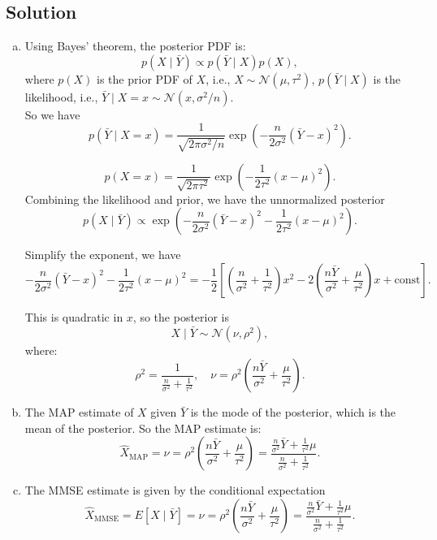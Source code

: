 \documentclass[a4paper]{article}
\begin{document}
\subsection{Solution}
\begin{enumerate}[(a)]
    \item

Using Bayes' theorem, the posterior PDF is:
\[
p(X \mid \bar{Y}) \propto p(\bar{Y} \mid X) p(X),
\]
where \( p(X) \) is the prior PDF of \( X \), i.e., \( X \sim \mathcal{N}(\mu, \tau^2) \),
\( p(\bar{Y} \mid X) \) is the likelihood, i.e., \( \bar{Y} \mid X = x \sim \mathcal{N}(x, \sigma^2 / n) \).\\
So we have
\[
p(\bar{Y} \mid X = x) = \frac{1}{\sqrt{2\pi \sigma^2 / n}} \exp\left( -\frac{n}{2\sigma^2} (\bar{Y} - x)^2 \right).
\]

\[
p(X = x) = \frac{1}{\sqrt{2\pi \tau^2}} \exp\left( -\frac{1}{2\tau^2} (x - \mu)^2 \right).
\]
Combining the likelihood and prior, we have the unnormalized posterior
\[
p(X \mid \bar{Y}) \propto \exp\left( -\frac{n}{2\sigma^2} (\bar{Y} - x)^2 - \frac{1}{2\tau^2} (x - \mu)^2 \right).
\]

Simplify the exponent, we have
\[
-\frac{n}{2\sigma^2} (\bar{Y} - x)^2 - \frac{1}{2\tau^2} (x - \mu)^2 = -\frac{1}{2} \left[ \left( \frac{n}{\sigma^2} + \frac{1}{\tau^2} \right)x^2 - 2 \left( \frac{n \bar{Y}}{\sigma^2} + \frac{\mu}{\tau^2} \right)x + \text{const} \right].
\]

This is quadratic in \( x \), so the posterior is 
\[
X \mid \bar{Y} \sim \mathcal{N}(\nu, \rho^2),
\]
where:
\[
\rho^2 = \frac{1}{\frac{n}{\sigma^2} + \frac{1}{\tau^2}}, \quad \nu = \rho^2 \left( \frac{n \bar{Y}}{\sigma^2} + \frac{\mu}{\tau^2} \right).
\]

\item The MAP estimate of \( X \) given \( \bar{Y} \) is the mode of the posterior, which is the mean of the posterior. So the MAP estimate is:
\[
\hat{X}_{\text{MAP}} = \nu = \rho^2 \left( \frac{n \bar{Y}}{\sigma^2} + \frac{\mu}{\tau^2} \right) = \frac{\frac{n}{\sigma^2} \bar{Y} + \frac{1}{\tau^2} \mu}{\frac{n}{\sigma^2} + \frac{1}{\tau^2}}.
\]

\item The MMSE estimate is given by the conditional expectation
\[
\hat{X}_{\text{MMSE}} = E[X \mid \bar{Y}] = \nu = \rho^2 \left( \frac{n \bar{Y}}{\sigma^2} + \frac{\mu}{\tau^2} \right) = \frac{\frac{n}{\sigma^2} \bar{Y} + \frac{1}{\tau^2} \mu}{\frac{n}{\sigma^2} + \frac{1}{\tau^2}}.
\]




\end{enumerate}
\end{document}
